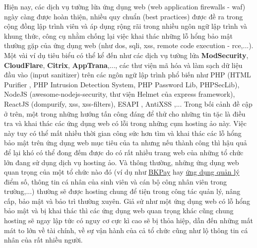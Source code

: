 Hiện nay, các dịch vụ tường lửa ứng dụng web (web application firewalls - \acrshort{waf}) ngày càng được hoàn thiện, nhiều quy chuẩn (best practices) được đề ra trong cộng đồng lập trình viên và áp dụng rộng rãi trong nhiều ngôn ngữ lập trình và khung thức, công cụ nhằm chống lại việc khai thác những lỗ hổng bảo mật thường gặp của ứng dụng web (như \acrshort{dos}, \acrshort{sqli}, \acrshort{xss}, remote code execution - \acrshort{rce},...). Một vài ví dụ tiêu biểu có thể kể đến như các dịch vụ tường lửa \textbf{ModSecurity}, \textbf{CloudFlare}, \textbf{Citrix}, \textbf{AppTrana},..., các thư viện mã hóa và làm sạch dữ liệu đầu vào (input sanitizer) trên các ngôn ngữ lập trình phổ biến như PHP (HTML Purifier \parencite{htmlpurifier}, PHP Intrusion Detection System, PHP Password Lib, PHPSecLib), NodeJS (awesome-nodejs-security, thư viện Helmet của express framework), ReactJS (dompurify, xss, xss-filters), ESAPI \parencite{esapi}, AntiXSS \parencite{antiXSS},... Trong bối cảnh đề cập ở trên, một trong những hướng tấn công đáng để thử cho những tin tặc là điều tra và khai thác các ứng dụng web có lỗi trong những cụm hosting ảo này. Việc này tuy có thể mất nhiều thời gian công sức hơn tìm và khai thác các lỗ hổng bảo mật trên ứng dụng web mục tiêu của ta nhưng nếu thành công thì hậu quả để lại khó có thể đong đếm được do có rất nhiều trang web của những tổ chức lớn đang sử dụng dịch vụ hosting ảo. Và thông thường, những ứng dụng web quan trọng của một tổ chức nào đó (ví dụ như \href{https://bkpay.hcmut.edu.vn/bkpay/home.action}{BKPay} hay \href{https://mybk.hcmut.edu.vn/stinfo/}{ứng dụng quản lý} điểm số, thông tin cá nhân của sinh viên và cán bộ công nhân viên trong trường,...) thường sẽ được hosting chung để tiện trong công tác quản lý, nâng cấp, bảo mật và bảo trì thường xuyên. Giả sử như một ứng dụng web có lỗ hổng bảo mật và bị khai thác thì các ứng dụng web quan trọng khác cũng chung hosting sẽ ngay lập tức có nguy cơ cực kì cao sẽ bị thỏa hiệp, dẫn đến những mất mát to lớn về tài chính, về sự vận hành của cả tổ chức cũng như lộ thông tin cá nhân của rất nhiều người. \par
